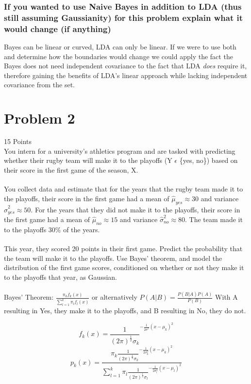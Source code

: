 \documentclass[12pt]{article}
\begin{document}
\subsubsection{If you wanted to use Naive Bayes in addition to LDA (thus still assuming Gaussianity) for this problem explain what it would change (if anything)}
Bayes can be linear or curved, LDA can only be linear. If we were to use both and determine how the boundaries would change we could apply the fact the Bayes does not need independent covariance to the fact that LDA \emph{does} require it, therefore gaining the benefits of LDA's linear approach while lacking independent covariance from the set.



\pagebreak
\section{Problem 2}
15 Points\\
You intern for a university's athletics program and are tasked with predicting whether their rugby team will make it to the playoffs (Y $\epsilon$ \{yes, no\}) based on their  score in the first game of the season, X.\\\\
You collect data and estimate that for the years that the rugby team made it to the playoffs, their score in the first game had a mean of $\hat{\mu}_{yes} \approx 30$ and variance $\hat{\sigma}^2_{yes} \approx 50$. For the years that they did not make it to the playoffs, their score in the first game had a mean of $\hat{\mu}_{no} \approx 15$ and variance $\hat{\sigma}^2_{no} \approx 80$. The team made it to the playoffs $30\%$ of the years.\\\\
This year, they scored 20 points in their first game. Predict the probability that the team will make it to the playoffs. Use Bayes' theorem, and model the distribution of the first game scores, conditioned on whether or not they make it to the playoffs that year, as Gaussian.
\\\\
Bayes' Theorem: $\frac{\pi_kf_k(x)}{\sum^k_{l=1}\pi_lf_l(x)}$ or alternatively $P(A|B) = \frac{P(B|A)P(A)}{P(B)}$ With A resulting in Yes, they make it to the playoffs, and B resulting in No, they do not.

\[
    f_k(x) = \frac{1}{(2\pi)^{\frac{1}{2}}\sigma_k}^{-\frac{1}{2\sigma^2}(x-\mu_k)^2}
\]
\[
    p_k(x)=\frac{\pi_k\frac{1}{(2\pi)^{\frac{1}{2}}\sigma_k}^{-\frac{1}{2\sigma_k^2}(x-\mu_k)^2}}{\sum^k_{l=1}\pi_l\frac{1}{(2\pi)^{\frac{1}{2}}\sigma_l}^{-\frac{1}{2\sigma_l^2}(x-\mu_l)^2}}
\]
\end{document}
